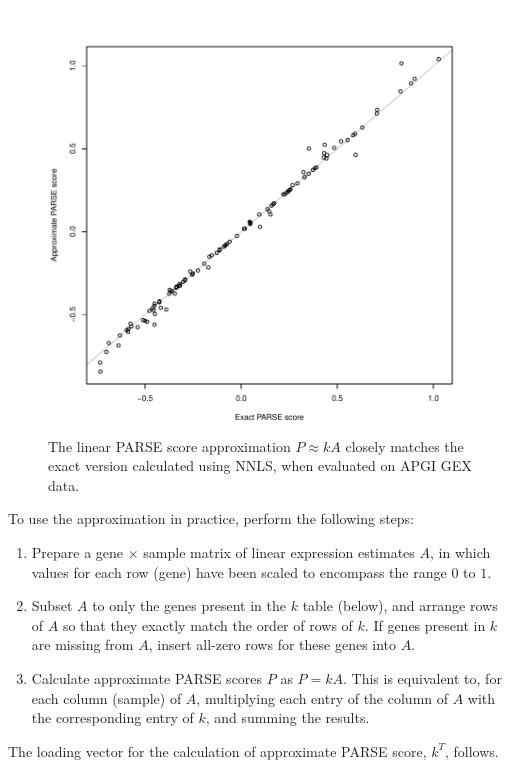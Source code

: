 \begin{figure}
\centering
\includegraphics[width=.7\linewidth]{analysis/biosurv/reports/18_SIS_diag_dsd_final/figure/approx-calc-1}
\caption[Performance of the \acrshort{PARSE} score approximation]{The linear \acrshort{PARSE} score approximation $P \approx k A$ closely matches the exact version calculated using \gls{NNLS}, when evaluated on \gls{APGI} \gls{GEX} data.}\label{fig:app-parse-approx-matching}
\end{figure}

To use the approximation in practice, perform the following steps:
\begin{enumerate}
  \item Prepare a gene $\times$ sample matrix of linear expression estimates $A$, in which values for each row (gene) have been scaled to encompass the range $0$ to $1$.
  \item Subset $A$ to only the genes present in the $k$ table (below), and arrange rows of $A$ so that they exactly match the order of rows of $k$.  If genes present in $k$ are missing from $A$, insert all-zero rows for these genes into $A$.
  \item Calculate approximate \gls{PARSE} scores $P$ as $P = k A$.  This is equivalent to, for each column (sample) of $A$, multiplying each entry of the column of $A$ with the corresponding entry of $k$, and summing the results.
\end{enumerate}

The loading vector for the calculation of approximate \gls{PARSE} score, $k^T$, follows.

